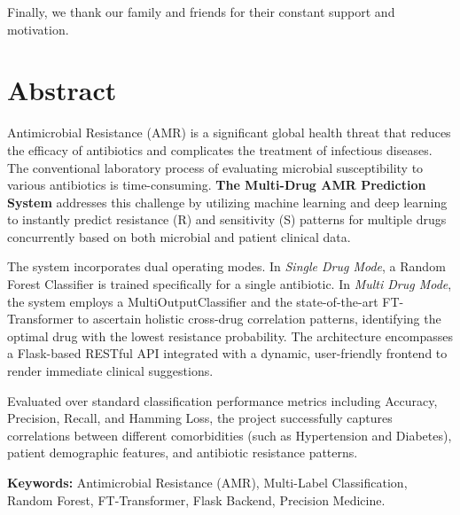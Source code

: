 \documentclass[12pt,a4paper]{report}
\begin{document}
Finally, we thank our family and friends for their constant support and motivation.

\chapter*{Abstract}
\thispagestyle{fancy}

Antimicrobial Resistance (AMR) is a significant global health threat that reduces the efficacy of antibiotics and complicates the treatment of infectious diseases. The conventional laboratory process of evaluating microbial susceptibility to various antibiotics is time-consuming. \textbf{The Multi-Drug AMR Prediction System} addresses this challenge by utilizing machine learning and deep learning to instantly predict resistance (R) and sensitivity (S) patterns for multiple drugs concurrently based on both microbial and patient clinical data.

The system incorporates dual operating modes. In \textit{Single Drug Mode}, a Random Forest Classifier is trained specifically for a single antibiotic. In \textit{Multi Drug Mode}, the system employs a MultiOutputClassifier and the state-of-the-art FT-Transformer to ascertain holistic cross-drug correlation patterns, identifying the optimal drug with the lowest resistance probability. The architecture encompasses a Flask-based RESTful API integrated with a dynamic, user-friendly frontend to render immediate clinical suggestions.

Evaluated over standard classification performance metrics including Accuracy, Precision, Recall, and Hamming Loss, the project successfully captures correlations between different comorbidities (such as Hypertension and Diabetes), patient demographic features, and antibiotic resistance patterns.

\vspace{0.5em}
\noindent\textbf{Keywords:} Antimicrobial Resistance (AMR), Multi-Label Classification, Random Forest, FT-Transformer, Flask Backend, Precision Medicine.

\tableofcontents
\thispagestyle{fancy}
\listoffigures
\thispagestyle{fancy}
\listoftables
\thispagestyle{fancy}
\end{document}
